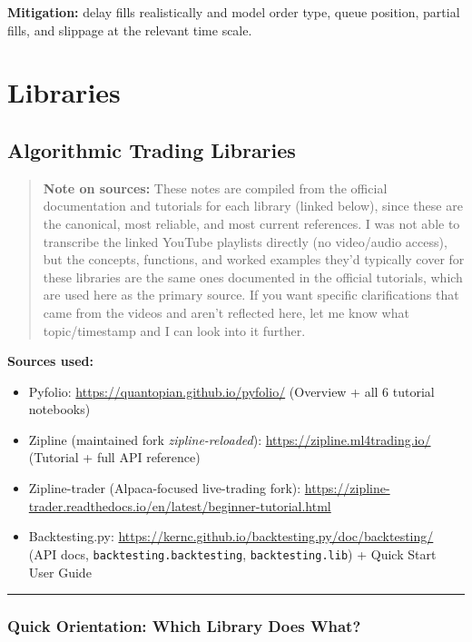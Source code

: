 \documentclass[12pt,openany]{book}
\theoremstyle{definition}
\theoremstyle{remark}
\begin{document}
\textbf{Mitigation:} delay fills realistically and model order type, queue
position, partial fills, and slippage at the relevant time scale.

\section{Libraries}

\subsection{Algorithmic Trading Libraries}

\begin{quote}
\textbf{Note on sources:} These notes are compiled from the official documentation and tutorials for each library (linked below), since these are the canonical, most reliable, and most current references. I was not able to transcribe the linked YouTube playlists directly (no video/audio access), but the concepts, functions, and worked examples they'd typically cover for these libraries are the same ones documented in the official tutorials, which are used here as the primary source. If you want specific clarifications that came from the videos and aren't reflected here, let me know what topic/timestamp and I can look into it further.

\end{quote}

\textbf{Sources used:}

\begin{itemize}
\item 
Pyfolio: \url{https://quantopian.github.io/pyfolio/} (Overview + all 6 tutorial notebooks)

\item 
Zipline (maintained fork \emph{zipline-reloaded}): \url{https://zipline.ml4trading.io/} (Tutorial + full API reference)

\item 
Zipline-trader (Alpaca-focused live-trading fork): \url{https://zipline-trader.readthedocs.io/en/latest/beginner-tutorial.html}

\item 
Backtesting.py: \url{https://kernc.github.io/backtesting.py/doc/backtesting/} (API docs, \texttt{backtesting.backtesting}, \texttt{backtesting.lib}) + Quick Start User Guide

\end{itemize}

\medskip
\hrule
\medskip
\subsubsection{Quick Orientation: Which Library Does What?}
\end{document}
